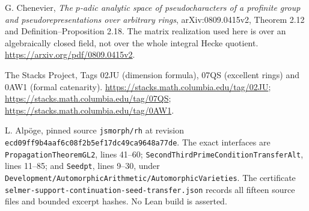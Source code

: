 G. Chenevier, \emph{The $p$-adic analytic space of pseudocharacters
of a profinite group and pseudorepresentations over arbitrary rings},
arXiv:0809.0415v2, Theorem 2.12 and Definition--Proposition 2.18.
The matrix realization used here is over an algebraically closed
field, not over the whole integral Hecke quotient.
\url{https://arxiv.org/pdf/0809.0415v2}.

The Stacks Project, Tags 02JU (dimension formula),
07QS (excellent rings) and 0AW1 (formal catenarity).
\url{https://stacks.math.columbia.edu/tag/02JU};
\url{https://stacks.math.columbia.edu/tag/07QS};
\url{https://stacks.math.columbia.edu/tag/0AW1}.

L. Alp\"oge, pinned source \texttt{jsmorph/rh} at revision
\texttt{ecd09ff9b4aaf6c08f2b5ef17dc49ca9648a77de}.
The exact interfaces are \texttt{PropagationTheoremGL2},
lines 41--60; \texttt{SecondThirdPrimeConditionTransferAlt},
lines 11--85; and \texttt{Seedpt}, lines 9--30, under
\texttt{Development/AutomorphicArithmetic/AutomorphicVarieties}.
The certificate \texttt{selmer-support-continuation-seed-transfer.json}
records all fifteen source files and bounded excerpt hashes.
No Lean build is asserted.
